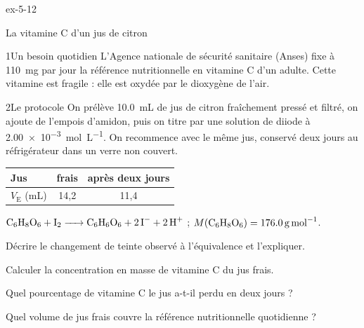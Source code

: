 \begin{blocLivre}{ex-5-12}
\begin{exercice}[3]{La vitamine C d'un jus de citron}
\begin{docu}{1}{Un besoin quotidien}
L'Agence nationale de sécurité sanitaire (Anses) fixe à \qty{110}{mg} par jour la référence nutritionnelle en vitamine C d'un adulte.
Cette vitamine est fragile : elle est oxydée par le dioxygène de l'air.
\end{docu}
\begin{docu}{2}{Le protocole}
On prélève \qty{10,0}{mL} de jus de citron fraîchement pressé et filtré, on ajoute de l'empois d'amidon, puis on titre par une
solution de diiode à \qty{2,00e-3}{mol.L^{-1}}. On recommence avec le même jus, conservé deux jours au réfrigérateur dans un
verre non couvert.
\par\smallskip\noindent\hfill\begin{tabular}{lcc}
\toprule
Jus & frais & après deux jours \\
\midrule
$V_\mathrm{E}$ (mL) & 14,2 & 11,4 \\
\bottomrule
\end{tabular}\hfill\null\par\smallskip
\end{docu}
\begin{donnees}
$\ce{C6H8O6 + I2 -> C6H6O6 + 2I- + 2H+}$ ; $M(\ce{C6H8O6})=\qty{176,0}{g.mol^{-1}}$.
\end{donnees}
\begin{questions}
\item Décrire le changement de teinte observé à l'équivalence et l'expliquer.
\item Calculer la concentration en masse de vitamine C du jus frais.
\item Quel pourcentage de vitamine C le jus a-t-il perdu en deux jours ?
\item \initiative Quel volume de jus frais couvre la référence nutritionnelle quotidienne ?
\end{questions}
\end{exercice}
\end{blocLivre}
